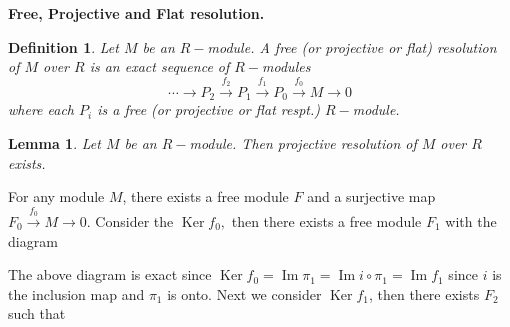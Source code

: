 \documentclass[11pt]{amsart}
\newtheorem{defn}[theorem]{Definition}
\newtheorem{lemma}[theorem]{Lemma}%
\DeclareMathOperator{\im}{\text{Im}}
\DeclareMathOperator{\Ker}{\text{Ker}}
\begin{document}
\textbf{Free, Projective and Flat resolution.}

\begin{defn}

Let $M$ be an $R-$module. A free (or projective or flat) resolution of $M$ over $R$ is an exact sequence of $R-$modules $$\cdots\to P_2\xrightarrow{f_2} P_1\xrightarrow{f_1} P_0\xrightarrow{f_0} M\to 0$$
where each $P_i$ is a free (or projective or flat respt.) $R-$module.
\end{defn}

\begin{lemma}

Let $M$ be an $R-$module. Then projective resolution of $M$ over $R$ exists.

\end{lemma}

\proof For any module $M$, there exists a free module $F$ and a surjective map $F_0\xrightarrow{f_0} M\to 0.$ Consider the $\Ker f_0,$ then there exists a free module $F_1$ with the diagram 

\begin{center}


\end{center}

The above diagram is exact since $\Ker f_0=\im \pi_1=\im i\circ \pi_1=\im f_1$ since $i$ is the inclusion map and $\pi_1$ is onto. Next we consider $\Ker f_1$, then there exists $F_2$ such that 

\begin{center}


\end{center}
\end{document}
